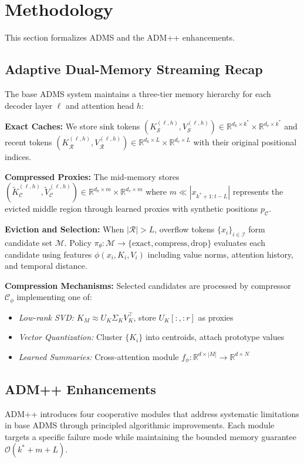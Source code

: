 \documentclass[11pt]{article}
\newcommand{\model}{\textsc{ADMS}}
\newcommand{\admpp}{\textsc{ADM++}}
\newcommand{\sink}{\mathcal{S}}
\newcommand{\recent}{\mathcal{R}}
\newcommand{\compressed}{\mathcal{C}}
\begin{document}
\section{Methodology}
This section formalizes \model{} and the \admpp{} enhancements.

\subsection{Adaptive Dual-Memory Streaming Recap}
The base \model{} system maintains a three-tier memory hierarchy for each decoder layer $\ell$ and attention head $h$:

\textbf{Exact Caches:} We store sink tokens $(K_{\sink}^{(\ell,h)}, V_{\sink}^{(\ell,h)}) \in \mathbb{R}^{d_k \times k^*} \times \mathbb{R}^{d_v \times k^*}$ and recent tokens $(K_{\recent}^{(\ell,h)}, V_{\recent}^{(\ell,h)}) \in \mathbb{R}^{d_k \times L} \times \mathbb{R}^{d_v \times L}$ with their original positional indices.

\textbf{Compressed Proxies:} The mid-memory stores $(\tilde K_{\compressed}^{(\ell,h)}, \tilde V_{\compressed}^{(\ell,h)}) \in \mathbb{R}^{d_k \times m} \times \mathbb{R}^{d_v \times m}$ where $m \ll |x_{k^*+1:t-L}|$ represents the evicted middle region through learned proxies with synthetic positions $p_{\compressed}$.

\textbf{Eviction and Selection:} When $|\recent| > L$, overflow tokens $\{x_i\}_{i \in \mathcal{I}}$ form candidate set $\mathcal{M}$. Policy $\pi_\theta: \mathcal{M} \rightarrow \{\text{exact}, \text{compress}, \text{drop}\}$ evaluates each candidate using features $\phi(x_i, K_i, V_i)$ including value norms, attention history, and temporal distance.

\textbf{Compression Mechanisms:} Selected candidates are processed by compressor $\mathcal{C}_\phi$ implementing one of:
\begin{itemize}
  \item \emph{Low-rank SVD:} $K_M \approx U_K \Sigma_K V_K^\top$, store $U_K[:, :r]$ as proxies
  \item \emph{Vector Quantization:} Cluster $\{K_i\}$ into centroids, attach prototype values
  \item \emph{Learned Summaries:} Cross-attention module $f_\phi: \mathbb{R}^{d \times |M|} \rightarrow \mathbb{R}^{d \times N}$
\end{itemize}

\subsection{ADM++ Enhancements}
\admpp{} introduces four cooperative modules that address systematic limitations in base \model{} through principled algorithmic improvements. Each module targets a specific failure mode while maintaining the bounded memory guarantee $\mathcal{O}(k^* + m + L)$.
\end{document}
